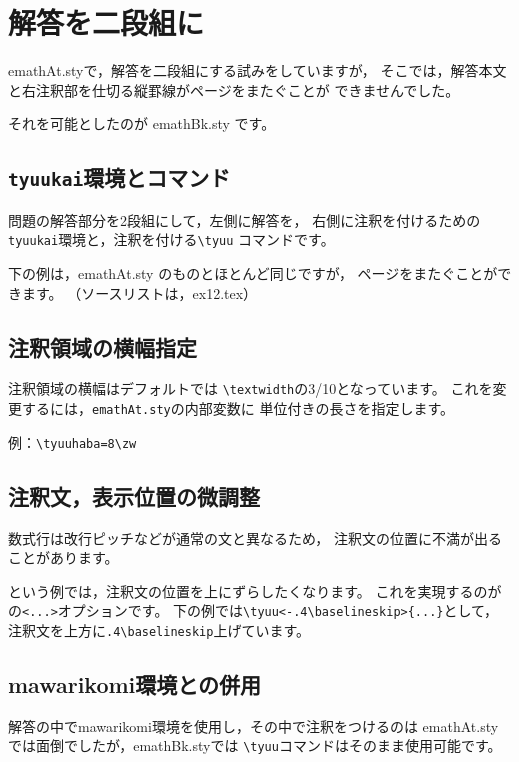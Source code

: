 \documentclass[a4j,fleqn]{jarticle}
\begin{document}
\section{解答を二段組に}
\textsf{emathAt.sty}で，解答を二段組にする試みをしていますが，
そこでは，解答本文と右注釈部を仕切る縦罫線がページをまたぐことが
できませんでした。

それを可能としたのが \textsf{emathBk.sty} です。

\subsection{\texttt{tyuukai}環境とコマンド}
問題の解答部分を2段組にして，左側に解答を，
右側に注釈を付けるための \verb+tyuukai+環境と，注釈を付ける\verb+\tyuu+
コマンドです。

下の例は，\textsf{emathAt.sty} のものとほとんど同じですが，
ページをまたぐことができます。
（ソースリストは，ex12.tex）



\subsection{注釈領域の横幅指定}
注釈領域の横幅はデフォルトでは \verb+\textwidth+の3/10となっています。
これを変更するには，\verb+emathAt.sty+の内部変数に
単位付きの長さを指定します。
\begin{jquote}
 例：\verb+\tyuuhaba=8\zw+
\end{jquote}

{}

\clearpage

\subsection{注釈文，表示位置の微調整}
数式行は改行ピッチなどが通常の文と異なるため，
注釈文の位置に不満が出ることがあります。



という例では，注釈文の位置を上にずらしたくなります。
これを実現するのがの\verb+<...>+オプションです。
下の例では\verb+\tyuu<-.4\baselineskip>{...}+として，
注釈文を上方に\verb+.4\baselineskip+上げています。


\clearpage

\subsection{\textsf{mawarikomi}環境との併用}
解答の中で\textsf{mawarikomi}環境を使用し，その中で注釈をつけるのは
\textsf{emathAt.sty}では面倒でしたが，\textsf{emathBk.sty}では
\verb+\tyuu+コマンドはそのまま使用可能です。
\end{document}

